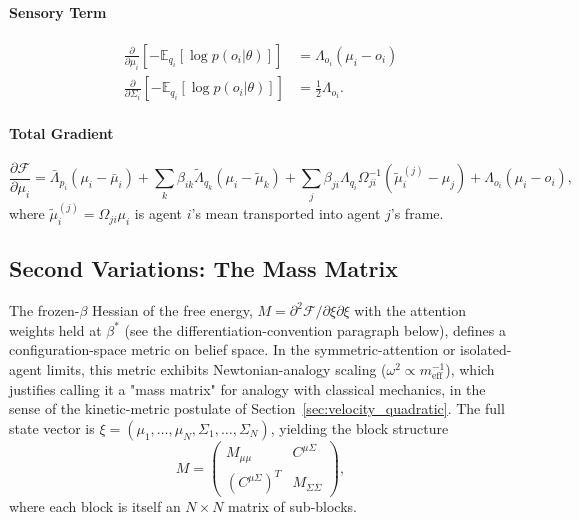 \documentclass[11pt]{article}
\begin{document}
\paragraph{Sensory Term}
\begin{align}
\frac{\partial}{\partial \mu_i}\left[-\mathbb{E}_{q_i}[\log p(o_i | \theta)]\right] &= \Lambda_{o_i}(\mu_i - o_i) \\
\frac{\partial}{\partial \Sigma_i}\left[-\mathbb{E}_{q_i}[\log p(o_i | \theta)]\right] &= \frac{1}{2}\Lambda_{o_i}.
\end{align}

\paragraph{Total Gradient}
\begin{equation}
\frac{\partial \mathcal{F}}{\partial \mu_i} = \bar{\Lambda}_{p_i}(\mu_i - \bar{\mu}_i) + \sum_k \beta_{ik}\tilde{\Lambda}_{q_k}(\mu_i - \tilde{\mu}_k) + \sum_j \beta_{ji}\Lambda_{q_i}\Omega_{ji}^{-1}(\tilde{\mu}_i^{(j)} - \mu_j) + \Lambda_{o_i}(\mu_i - o_i),
\label{eq:total_gradient_mu}
\end{equation}
where $\tilde{\mu}_i^{(j)} = \Omega_{ji}\mu_i$ is agent $i$'s mean transported into agent $j$'s frame.

\subsection{Second Variations: The Mass Matrix}

The frozen-$\beta$ Hessian of the free energy, $M = \partial^2 \mathcal{F}/\partial\xi\partial\xi$ with the attention weights held at $\beta^*$ (see the differentiation-convention paragraph below), defines a configuration-space metric on belief space. In the symmetric-attention or isolated-agent limits, this metric exhibits Newtonian-analogy scaling ($\omega^2 \propto m_{\text{eff}}^{-1}$), which justifies calling it a "mass matrix" for analogy with classical mechanics, in the sense of the kinetic-metric postulate of Section~\ref{sec:velocity_quadratic}. The full state vector is $\xi = (\mu_1, \ldots, \mu_N, \Sigma_1, \ldots, \Sigma_N)$, yielding the block structure
\begin{equation}
M = \begin{pmatrix} M_{\mu\mu} & C^{\mu\Sigma} \\ (C^{\mu\Sigma})^T & M_{\Sigma\Sigma} \end{pmatrix},
\label{eq:mass_block_structure}
\end{equation}
where each block is itself an $N \times N$ matrix of sub-blocks.
\end{document}
